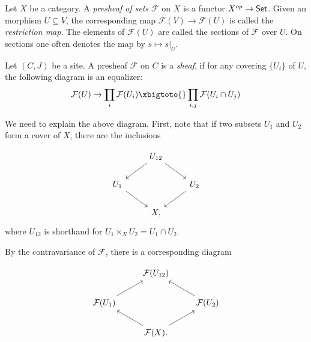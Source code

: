 \begin{definition}[Presheaves] 
  Let $X$ be a category. A \textit{presheaf of sets} $\mathcal{F}$ on $X$ is a functor $X^{op} \to \mathsf{Set}$. Given an morphism $U \subseteq V$, the corresponding map $\mathcal{F}(V) \to \mathcal{F}(U)$ is called the \textit{restriction map}. The elements of $\mathcal{F}(U)$ are called the sections of $\mathcal{F}$ over $U$. On sections one often denotes the map by $s \mapsto s|_U$.
\end{definition}

\begin{definition}[Sheaves]
  Let $(C,J)$ be a site.  A presheaf $\mathcal{F}$ on $C$ is a \textit{sheaf}, if for any covering $\{U_i\}$ of $U$, the following diagram is an equalizer:
  \begin{equation} \label{equalizer:1}
    \mathcal{F}(U) \to \prod_{i} \mathcal{F}(U_i) \xbigtoto{} \prod_{i,j} \mathcal{F}(U_i \cap U_j)
  \end{equation}
\end{definition}

We need to explain the above diagram. First, note that if two subsets $U_1$ and $U_2$ form a cover of $X$, there are the inclusions

\[\begin{tikzcd}
	& {U_{12}} \\
	{U_1} && {U_2} \\
	& X,
	\arrow[from=1-2, to=2-1]
	\arrow[from=1-2, to=2-3]
	\arrow[from=2-1, to=3-2]
	\arrow[from=2-3, to=3-2]
\end{tikzcd}\]
where $U_{12}$ is shorthand for $U_1 \times_X U_2 = U_1 \cap U_2$.

By the contravariance of $\mathcal{F}$, there is a corresponding diagram

\[\begin{tikzcd}
	& {\mathcal{F}(U_{12})} \\
	{\mathcal{F}(U_1)} && {\mathcal{F}(U_2)} \\
	& {\mathcal{F}(X)}.
	\arrow[from=2-1, to=1-2]
	\arrow[from=2-3, to=1-2]
	\arrow[from=3-2, to=2-1]
	\arrow[from=3-2, to=2-3]
\end{tikzcd}\]

